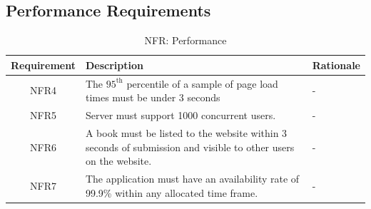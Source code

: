 \documentclass[fullpage]{article}
\begin{document}
\subsection{Performance Requirements}
\begin{table}[h]
\flushleft
\begin{tabular}{|c|p{6cm}|p{6cm}|}
\hline
 \rowcolor{lightgray} 
\textbf{Requirement} & \textbf{Description} & \textbf{Rationale} \\
\hline
NFR4 & The $95^{\text{th}}$ percentile of a sample of page load times must be under 3 seconds & -\\

% 
\hline
NFR5 &Server must support 1000 concurrent users.& - \\ %
\hline

NFR6 & A book must be listed to the website within 3 seconds of submission and visible to other users on the website.&- \\
\hline
NFR7& The application must have an availability rate of 99.9\% within any allocated time frame.&-\\
\hline
\end{tabular}
\caption{NFR: Performance}
\end{table}
\end{document}
